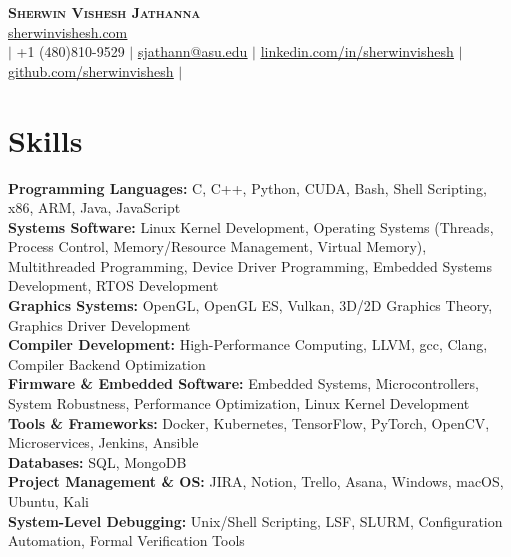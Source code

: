 \documentclass[letterpaper,11pt]{article}
\begin{document}
\begin{center}
    \textbf{\Huge \scshape Sherwin Vishesh Jathanna} \\ \vspace{1pt}
     \href{https://sherwinvishesh.com}{\underline{sherwinvishesh.com}} 
   \\ \small $|$ +1 (480)810-9529 $|$ \href{mailto:sjathann@asu.edu}{\underline{sjathann@asu.edu}} $|$ 
    \href{https://linkedin.com/in/sherwinvishesh}{\underline{linkedin.com/in/sherwinvishesh}} $|$
    \href{https://github.com/sherwinvishesh}{\underline{github.com/sherwinvishesh}} $|$
     \\ 
\end{center}

\section{Skills}
 \begin{itemize}[leftmargin=0.15in, label={}]
    \small{\item{
     \textbf{Programming Languages:}{ C, C++, Python, CUDA, Bash, Shell Scripting, x86, ARM, Java, JavaScript} \\
     \textbf{Systems Software:}{ Linux Kernel Development, Operating Systems (Threads, Process Control, Memory/Resource Management, Virtual Memory), Multithreaded Programming, Device Driver Programming, Embedded Systems Development, RTOS Development} \\
     \textbf{Graphics Systems:}{ OpenGL, OpenGL ES, Vulkan, 3D/2D Graphics Theory, Graphics Driver Development} \\
     \textbf{Compiler Development:}{ High-Performance Computing, LLVM, gcc, Clang, Compiler Backend Optimization} \\
     \textbf{Firmware \& Embedded Software:}{ Embedded Systems, Microcontrollers, System Robustness, Performance Optimization, Linux Kernel Development} \\
     \textbf{Tools \& Frameworks:}{ Docker, Kubernetes, TensorFlow, PyTorch, OpenCV, Microservices, Jenkins, Ansible} \\
     \textbf{Databases:}{ SQL, MongoDB} \\
     \textbf{Project Management \& OS:}{ JIRA, Notion, Trello, Asana, Windows, macOS, Ubuntu, Kali} \\
     \textbf{System-Level Debugging:}{ Unix/Shell Scripting, LSF, SLURM, Configuration Automation, Formal Verification Tools} \\
    }}
 \end{itemize}
\end{document}
